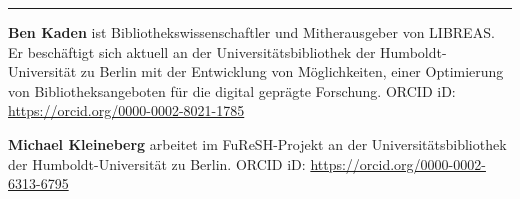 \begin{center}\rule{0.5\linewidth}{\linethickness}\end{center}

\textbf{Ben Kaden} ist Bibliothekswissenschaftler und Mitherausgeber von
LIBREAS. Er beschäftigt sich aktuell an der Universitätsbibliothek der
Humboldt-Universität zu Berlin mit der Entwicklung von Möglichkeiten,
einer Optimierung von Bibliotheksangeboten für die digital geprägte
Forschung. ORCID iD: \url{https://orcid.org/0000-0002-8021-1785}

\textbf{Michael Kleineberg} arbeitet im FuReSH-Projekt an der
Universitätsbibliothek der Humboldt-Universität zu Berlin. ORCID iD:
\url{https://orcid.org/0000-0002-6313-6795}

